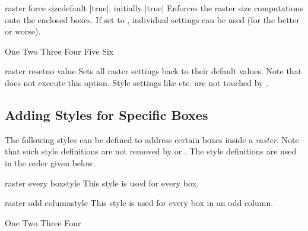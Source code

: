 \clearpage

\begin{docTcbKey}[][doc new=2014-11-10]{raster force size}{}{default |true|, initially |true|}
  Enforces the raster size computations onto the enclosed boxes.
  If set to , individual settings can be used (for the better or worse).
\begin{dispExample}
\begin{tcbitemize}[raster force size=false, raster halign=center,
  size=small,colframe=red!50!black,colback=red!10!white]
  \tcbitem One
  \tcbitem Two
  \tcbitem[add to width=-3cm] Three
  \tcbitem[add to width=-3cm] Four
  \tcbitem[add to width=-3cm] Five
  \tcbitem[add to width=3cm] Six
\end{tcbitemize}
\end{dispExample}
\end{docTcbKey}



\begin{docTcbKey}[][doc new=2014-11-10]{raster reset}{}{no value}
  Sets all raster settings back to their default values.
  Note that  does not execute this option.
  Style settings like  etc. are not
  touched by .
\end{docTcbKey}



\subsection{Adding Styles for Specific Boxes}\label{subsec:raster_styles}

The following styles can be defined to address certain boxes inside
a \emph{raster}. Note that such style definitions are not removed by
 or .
The style definitions are used in the order given below.

\begin{docTcbKey}[][doc new=2014-11-24]{raster every box}{}{style}
This style is used for every box.
\end{docTcbKey}

\begin{docTcbKey}[][doc new=2014-11-10]{raster odd column}{}{style}
This style is used for every box in an odd column.
\begin{dispExample}
\begin{tcbitemize}[size=small,colframe=red!50!black,colback=red!10!white,
  raster odd column/.style={colframe=blue!50!black,colback=blue!10!white}]
  \tcbitem One
  \tcbitem Two
  \tcbitem Three
  \tcbitem Four
\end{tcbitemize}
\end{dispExample}
\end{docTcbKey}

